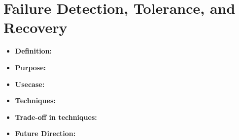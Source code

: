 \section{Failure Detection, Tolerance, and Recovery}
\label{sec:fault}

\begin{itemize}
	\item \textbf{Definition: } 
	\item \textbf{Purpose: } 
	\item \textbf{Usecase:}
	\item \textbf{Techniques: }
	\item \textbf{Trade-off in techniques: } 
	\item \textbf{Future Direction:} 
\end{itemize}


